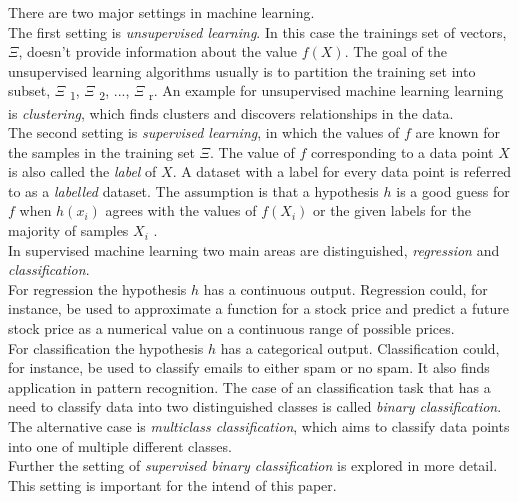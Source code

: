 There are two major settings in machine learning. 
\\
The first setting is \emph{unsupervised learning}. In this case the trainings set of vectors, $\Xi$, doesn't provide information about the value $f(X)$. The goal of the unsupervised learning algorithms usually is to partition the training set into subset, $\Xi$ \textsubscript{1}, $\Xi$ \textsubscript{2}, ..., $\Xi$ \textsubscript{r}. An example for unsupervised machine learning learning is \emph{clustering}, which finds clusters and discovers relationships in the data.
\\
The second setting is  \emph{supervised learning}, in which the values of $f$ are known for the samples in the training set $\Xi$. The value of $f$ corresponding to a data point $X$ is also called the \emph{label} of $X$. A dataset with a label for every data point is referred to as a \emph{labelled} dataset. The assumption is that a hypothesis $h$ is a good guess for $f$ when $h(x_i)$ agrees with the values of $f(X_i)$ or the given labels for the majority of samples $X_i$ .
\\
In supervised machine learning two main areas are distinguished, \emph{regression} and \emph{classification}. 
\\
For regression the hypothesis $h$ has a continuous output. Regression could, for instance, be used to approximate a function for a stock price and predict a future stock price as a numerical value on a continuous range of possible prices.\\
For classification the hypothesis $h$ has a categorical output. Classification could, for instance, be used to classify emails to either spam or no spam. It also finds application in pattern recognition. 
The case of an classification task that has a need to classify data into two distinguished classes is called \textit{binary classification}. The alternative case is \textit{multiclass classification}, which aims to classify data points into one of multiple different classes.\\

Further the setting of \emph{supervised binary classification} is explored in more detail. This setting is important for the intend of this paper.

